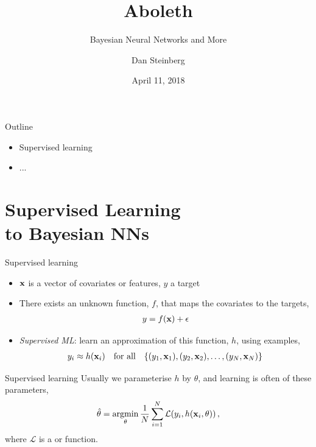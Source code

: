 \documentclass[lualatex, aspectratio=169]{beamer}
\title{Aboleth}
\subtitle{Bayesian Neural Networks and More}
\author{Dan Steinberg}
\date{April 11, 2018}
\institute{Inference Systems Engineering}
\begin{document}
\maketitle

\begin{frame}{Outline}
  \begin{itemize}
    \item Supervised learning
    \item ...
  \end{itemize}
\end{frame}


\section{Supervised Learning \\ to Bayesian NNs}


\begin{frame}{Supervised learning}
  \begin{itemize}
    \item <1-> $\mathbf{x}$ is a vector of covariates or features, $y$ a target 
    \item <2-> There exists an unknown function, $f$, that maps the covariates to the targets,
      \begin{align*}
        y = f(\mathbf{x}) + \epsilon
      \end{align*}
    \item <3-> \emph{Supervised ML}: learn an approximation of this function, $h$, using examples,
      \begin{align*}
        y_i \approx h(\mathbf{x}_i) \quad \text{for all} \quad \{(y_1, \mathbf{x}_1), (y_2, \mathbf{x}_2), \ldots,
          (y_N, \mathbf{x}_N) \}
      \end{align*}
  \end{itemize}
\end{frame}


\begin{frame}{Supervised learning}
  Usually we parameterise $h$ by $\theta$, and learning is often  of these parameters,
  \begin{align*}
    \hat{\theta} = \argmin_\theta \frac{1}{N} \sum^N_{i=1} \mathcal{L}\!\left(y_i, h(\v{x}_i, \theta)\right),
  \end{align*}
  where $\mathcal{L}$ is a  or  function.

\end{frame}
\end{document}
